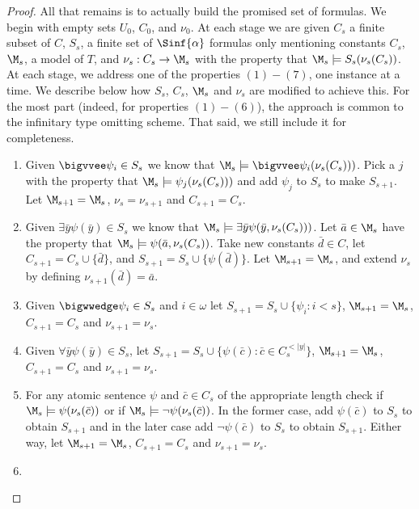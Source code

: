 \documentclass{amsart}
\renewcommand{\-}{\text{-}}
\begin{document}
\begin{proof}
		All that remains is to actually build the promised set of formulas.
		We begin with empty sets $U_0$, $C_0$, and $\nu_0$.
		At each stage we are given $C_s$ a finite subset of $C$, $S_s$, a finite set of  $\Sinf{\alpha}$ formulas only mentioning constants $C_s$, $\M_s$, a model of $T$, and $\nu_s:C_s\to \M_s$ with the property that $\M_s\models S_s(\nu_s(C_s))$.
		At each stage, we address one of the properties $(1)-(7)$, one instance at a time.
		We describe below how $S_s$, $C_s$, $\M_s$ and $\nu_s$ are modified to achieve this.
		For the most part (indeed, for properties $(1)-(6)$), the approach is common to the infinitary type omitting scheme.
		That said, we still include it for completeness.
		
    \begin{enumerate}[align=left,leftmargin=\parindent]
      \item[Property $(1)$]
			Given $\bigvvee \psi_i \in S_s$ we know that $\M_s\models \bigvvee \psi_i (\nu_s(C_s)))$. 
			Pick a $j$ with the property that $\M_s\models \psi_j (\nu_s(C_s)))$ and add $\psi_j$ to $S_s$ to make $S_{s+1}$.
			Let $\M_{s+1}=\M_s$, $\nu_s=\nu_{s+1}$ and $C_{s+1}=C_s$.
			\item[Property $(2)$]
			Given $\exists \bar y \psi(\bar y) \in S_s$ we know that  $\M_s\models  \exists \bar y\psi (\bar{y}, \nu_s(C_s)))$.
			Let $\bar{a}\in\M_s$ have the property that $\M_s\models \psi(\bar{a},\nu_s(C_s))$.
			Take new constants $\bar{d}\in C$, let $C_{s+1}=C_s\cup\{\bar{d}\}$, and $S_{s+1}= S_s\cup\{\psi(\bar{d})\}$.
			Let $\M_{s+1}=\M_s$, and extend $\nu_s$ by defining $\nu_{s+1}(\bar{d})=\bar{a}$.
			\item[Property $(3)$]
			Given $\bigwwedge \psi_i \in S_s$ and $i\in\omega$ let $S_{s+1}=S_s\cup\{\psi_i:i<s\}$, $\M_{s+1}=\M_s$, $C_{s+1}=C_s$ and $\nu_{s+1}=\nu_s$.
			\item[Property $(4)$]
        Given $\forall \bar y \psi(\bar y) \in S_s$, let $S_{s+1}=S_s\cup\{\psi(\bar c): \bar c\in C_s^{<|y|}\}$, $\M_{s+1}=\M_s$, $C_{s+1}=C_s$ and $\nu_{s+1}=\nu_s$.
			\item[Property $(5)$]
			For any atomic sentence $\psi$ and $\bar{c}\in C_s$ of the appropriate length check if $\M_s\models \psi(\nu_s(\bar{c}))$ or if $\M_s\models \lnot\psi(\nu_s(\bar{c}))$.
			In the former case, add $\psi(\bar{c})$ to $S_s$ to obtain $S_{s+1}$ and in the later case  add $\lnot\psi(\bar{c})$ to $S_s$ to obtain $S_{s+1}$.
			Either way, let $\M_{s+1}=\M_s$, $C_{s+1}=C_s$ and $\nu_{s+1}=\nu_s$.
			\item[Property $(6)$]

\end{enumerate}
\end{proof}
\end{document}
